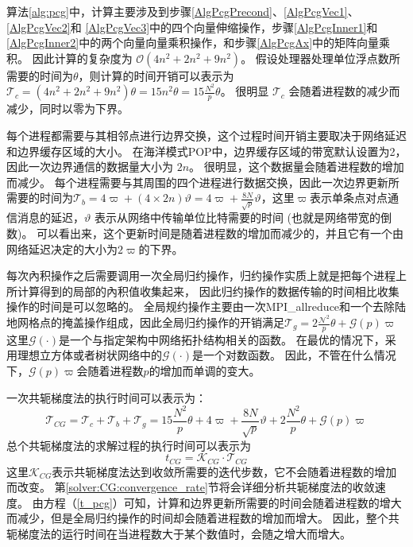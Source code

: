 算法\ref{alg:pcg}中，计算主要涉及到步骤\ref{AlgPcgPrecond}、\ref{AlgPcgVec1}、\ref{AlgPcgVec2}和 \ref{AlgPcgVec3}中的四个向量伸缩操作，步骤\ref{AlgPcgInner1}和\ref{AlgPcgInner2}中的两个向量向量乘积操作，和步骤\ref{AlgPcgAx}中的矩阵向量乘积。 
因此计算的复杂度为 $\mathcal{O} (4 n^2 +2n^2+ 9n^2)$。 
假设处理器处理单位浮点数所需要的时间为$\theta$，则计算的时间开销可以表示为
$\mathcal{T}_c=  (4 n^2 +2n^2+ 9n^2)\theta = 15n^2\theta  = 15\frac{N^2}{p}\theta $。 
很明显 $\mathcal{T}_c$ 会随着进程数的减少而减少，同时以零为下界。 


每个进程都需要与其相邻点进行边界交换，这个过程时间开销主要取决于网络延迟和边界缓存区域的大小。 
在海洋模式POP中，边界缓存区域的带宽默认设置为2，因此一次边界通信的数据量大小为 $2n$。 
很明显，这个数据量会随着进程数的增加而减少。 
每个进程需要与其周围的四个进程进行数据交换，因此一次边界更新所需要的时间为$\mathcal{T}_b =4\varpi + (4\times 2n)\vartheta=4\varpi + \frac{8N}{\sqrt{p}}\vartheta$，这里$\varpi$表示单条点对点通信消息的延迟，$\vartheta$ 表示从网络中传输单位比特需要的时间 (也就是网络带宽的倒数)。 
可以看出来，这个更新时间是随着进程数的增加而减少的，并且它有一个由网络延迟决定的大小为$2\varpi$的下界。



每次內积操作之后需要调用一次全局归约操作，归约操作实质上就是把每个进程上所计算得到的局部的內积值收集起来，
因此归约操作的数据传输的时间相比收集操作的时间是可以忽略的。 
全局规约操作主要由一次MPI\_allreduce和一个去除陆地网格点的掩盖操作组成，因此全局归约操作的开销满足$\mathcal{T}_g= 2\frac{\mathcal{N}^2}{p}\theta + \mathcal{G}(p)\varpi$  
这里$\mathcal{G}(\cdot)$是一个与指定架构中网络拓扑结构相关的函数。 
在最优的情况下，采用理想立方体或者树状网络中的$\mathcal{G}(\cdot)$是一个对数函数。 
因此，不管在什么情况下，$\mathcal{G}(p)\varpi$会随着进程数$p$的增加而单调的变大。 
 
一次共轭梯度法的执行时间可以表示为：
\begin{equation}
\label{t_pcg}
\mathcal{T}_{CG} = \mathcal{T}_c + \mathcal{T}_b + \mathcal{T}_g
= 15\frac{N^2}{p}\theta + 4\varpi + \frac{8N}{\sqrt{p}}\vartheta+2\frac{N^2}{p}\theta + \mathcal{G}(p)\varpi
\end{equation}
总个共轭梯度法的求解过程的执行时间可以表示为
\begin{equation}
\label{t_pcg_all}
t_{CG} = \mathcal{K}_{CG}\cdot \mathcal{T}_{CG}
\end{equation}
这里$\mathcal{K}_{CG}$表示共轭梯度法达到收敛所需要的迭代步数，它不会随着进程数的增加而改变。
第\ref{solver:CG:convergence_rate}节将会详细分析共轭梯度法的收敛速度。
由方程（\ref{t_pcg}）可知，计算和边界更新所需要的时间会随着进程数的增大而减少，但是全局归约操作的时间却会随着进程数的增加而增大。
因此，整个共轭梯度法的运行时间在当进程数大于某个数值时，会随之增大而增大。



